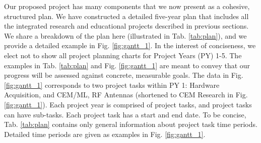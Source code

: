 \documentclass[10pt]{amsart}
\theoremstyle{definition}
\numberwithin{equation}{section}
\begin{document}
Our proposed project has many components that we now present as a cohesive, structured plan.  We have constructed a detailed five-year plan that includes all the integrated research and educational projects described in previous sections.  We share a breakdown of the plan here (illustrated in Tab. \ref{tab:plan}), and we provide a detailed example in Fig. \ref{fig:gantt_1}.  In the interest of conciseness, we elect not to show all project planning charts for Project Years (PY) 1-5.  The examples in Tab. \ref{tab:plan} and Fig. \ref{fig:gantt_1} are meant to convey that our progress will be assessed against concrete, measurable goals.  The data in Fig. \ref{fig:gantt_1} corresponds to two project tasks within PY 1: Hardware Acquisition, and CEM/ML, RF Antennas (shortened to CEM Research in Fig. \ref{fig:gantt_1}).  Each project year is comprised of project tasks, and project tasks can have sub-tasks.  Each project task has a start and end date.  To be concise, Tab. \ref{tab:plan} contains only general information about project task time periods.  Detailed time periods are given as examples in Fig. \ref{fig:gantt_1}.
\end{document}
